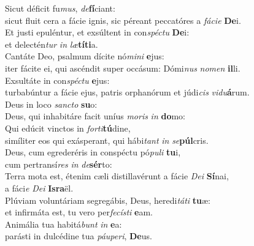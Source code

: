 \evenverse Sicut déficit fu\textit{mus}, \textit{de}\textbf{fí}ciant:~\*\\
\evenverse sicut fluit cera a fácie ignis, sic péreant peccatóres a \textit{fá}\textit{ci}\textit{e} \textbf{De}i.\\
\oddverse Et justi epuléntur, et exsúltent in con\textit{spé}\textit{ctu} \textbf{De}i:~\*\\
\oddverse et delectén\textit{tur} \textit{in} \textit{læ}\textbf{tí}\textbf{ti}a.\\
\evenverse Cantáte Deo, psalmum dícite nó\textit{mi}\textit{ni} \textbf{e}jus:~\*\\
\evenverse iter fácite ei, qui ascéndit super occásum: Dómi\textit{nus} \textit{no}\textit{men} \textbf{il}li.\\
\oddverse Exsultáte in con\textit{spé}\textit{ctu} \textbf{e}jus:~\*\\
\oddverse turbabúntur a fácie ejus, patris orphanórum et júdi\textit{cis} \textit{vi}\textit{du}\textbf{á}rum.\\
\evenverse Deus in loco \textit{san}\textit{cto} \textbf{su}o:~\*\\
\evenverse Deus, qui inhabitáre facit uníus \textit{mo}\textit{ris} \textit{in} \textbf{do}mo:\\
\oddverse Qui edúcit vinctos in \textit{for}\textit{ti}\textbf{tú}dine,~\*\\
\oddverse simíliter eos qui exásperant, qui hábi\textit{tant} \textit{in} \textit{se}\textbf{púl}cris.\\
\evenverse Deus, cum egrederéris in conspéctu pó\textit{pu}\textit{li} \textbf{tu}i,~\*\\
\evenverse cum pertransí\textit{res} \textit{in} \textit{de}\textbf{sér}to:\\
\oddverse Terra mota est, étenim cæli distillavérunt a fácie \textit{De}\textit{i} \textbf{Sí}nai,~\*\\
\oddverse a fáci\textit{e} \textit{De}\textit{i} \textbf{Is}\textbf{ra}ël.\\
\evenverse Plúviam voluntáriam segregábis, Deus, heredi\textit{tá}\textit{ti} \textbf{tu}æ:~\*\\
\evenverse et infirmáta est, tu vero per\textit{fe}\textit{cí}\textit{sti} \textbf{e}am.\\
\oddverse Animália tua habitá\textit{bunt} \textit{in} \textbf{e}a:~\*\\
\oddverse parásti in dulcédine tua \textit{páu}\textit{pe}\textit{ri}, \textbf{De}us.\\
